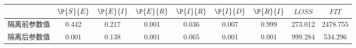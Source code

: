 \begin{tabular}{ccccccccc}
\hline
&$\P{S}{E}$&$\P{E}{I}$&$\P{E}{R}$&$\P{I}{R}$&$\P{I}{D}$&$\P{R}{I}$&$LOSS$&$FIT$\\
\hline
隔离前参数值&0.442&0.217&0.001&0.036&0.007&0.999&273.012&2478.755\\
隔离后参数值&0.001&0.138&0.001&0.065&0.001&0.001&999.284&534.296\\
\hline
\end{tabular}